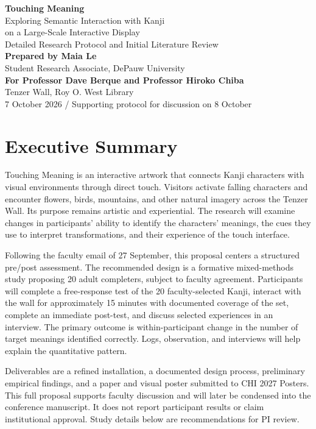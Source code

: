 \documentclass[11pt,letterpaper]{article}
\begin{document}
\begin{center}
{\LARGE\bfseries Touching Meaning}\\[6pt]
{\Large Exploring Semantic Interaction with Kanji\\on a Large-Scale Interactive Display}\\[12pt]
{\large Detailed Research Protocol and Initial Literature Review}\\[8pt]
\textbf{Prepared by Maia Le}\\
Student Research Associate, DePauw University\\[5pt]
\textbf{For Professor Dave Berque and Professor Hiroko Chiba}\\
Tenzer Wall, Roy O. West Library\\[5pt]
7 October 2026 / Supporting protocol for discussion on 8 October
\end{center}

\section*{Executive Summary}
Touching Meaning is an interactive artwork that connects Kanji characters with visual environments through direct touch. Visitors activate falling characters and encounter flowers, birds, mountains, and other natural imagery across the Tenzer Wall. Its purpose remains artistic and experiential. The research will examine changes in participants' ability to identify the characters' meanings, the cues they use to interpret transformations, and their experience of the touch interface.

Following the faculty email of 27 September, this proposal centers a structured pre/post assessment. The recommended design is a formative mixed-methods study proposing 20 adult completers, subject to faculty agreement. Participants will complete a free-response test of the 20 faculty-selected Kanji, interact with the wall for approximately 15 minutes with documented coverage of the set, complete an immediate post-test, and discuss selected experiences in an interview. The primary outcome is within-participant change in the number of target meanings identified correctly. Logs, observation, and interviews will help explain the quantitative pattern.

Deliverables are a refined installation, a documented design process, preliminary empirical findings, and a paper and visual poster submitted to CHI 2027 Posters. This full proposal supports faculty discussion and will later be condensed into the conference manuscript. It does not report participant results or claim institutional approval. Study details below are recommendations for PI review.
\end{document}
